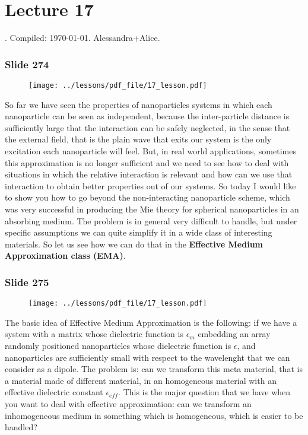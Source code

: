 \documentclass[../main/main.tex]{subfiles}
\begin{document}
\section{Lecture 17}
 . Compiled:  \today. Alessandra+Alice.

\subsubsection{Slide 274}

\begin{figure}[h!]
\centering
\texttt{[image: ../lessons/pdf\_file/17\_lesson.pdf]}
\end{figure}

So far we have seen the properties of nanoparticles systems in which each nanoparticle can be seen as independent, because the inter-particle distance is sufficiently large that the interaction can be safely neglected, in the sense that the external field, that is the plain wave that exits our system is the only excitation each nanoparticle will feel. But, in real world applications, sometimes this approximation is no longer sufficient and we need to see how to deal with situations in which the relative interaction is relevant and how can we use that interaction to obtain better properties out of our systems. So today I would like to show you how to go beyond the non-interacting nanoparticle scheme, which was very successful in producing the Mie theory for spherical nanoparticles in an absorbing medium. The problem is in general very difficult to handle, but under specific assumptions we can quite simplify it in a wide class of interesting materials.
So let us see how we can do that in the \textbf{Effective Medium Approximation class (EMA)}.

\newpage

\subsubsection{Slide 275}

\begin{figure}[h!]
\centering
\texttt{[image: ../lessons/pdf\_file/17\_lesson.pdf]}
\end{figure}

The basic idea of Effective Medium Approximation is the following: if we have a system with a matrix whose dielectric function is $\epsilon_{m}$ embedding an array randomly positioned nanoparticles whose dielectric function is $\epsilon$, and nanoparticles are sufficiently small with respect to the wavelenght that we can consider as a dipole. The problem is: can we transform this meta material, that is a material made of different material, in an homogeneous material with an effective dielectric constant $\epsilon_{eff}$.
This is the major question that we have when you want to deal with effective approximation: can we transform an inhomogeneous medium in something which is homogeneous, which is easier to be handled?
\end{document}
